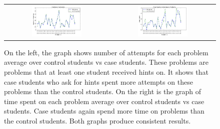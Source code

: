 \documentclass{llncs}
\begin{document}
\begin{figure}[ht]
\centering
\caption{On the left, the graph shows number of attempts for each problem average over control students vs case students. These problems are problems that at least one student received hints on. It shows that case students who ask for hints spent more attempts on these problems than the control students. On the right is the graph of time spent on each problem average over control students vs case students. Case students again spend more time on problems than the control students. Both graphs produce consistent results.}
   \begin{tabular}{c c}
		\includegraphics[width=0.5\textwidth]{image/new_tries_analysis.png} &
		\includegraphics[width=0.5\textwidth]{image/new_times_analysis.png}
	\end{tabular}
    \label{fig:tries_times_analysis}
\end{figure}

\end{document}
